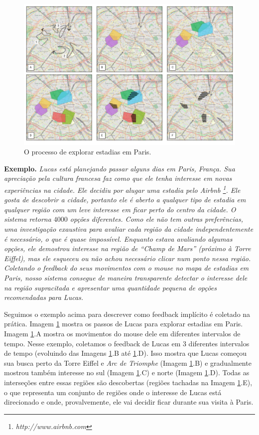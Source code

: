 \begin{figure}[t]
	\centering
	\includegraphics[width=\textwidth]{imagens/caso-de-estudo}
	\caption{O processo de explorar estadias em Paris.}
	\label{fig:regions}
\end{figure}

{\bf Exemplo.} {\em Lucas está planejando passar alguns dias em Paris, França. Sua apreciação pela cultura francesa faz como que ele tenha interesse em novas experiências na cidade. Ele decidiu por alugar uma estadia pelo Airbnb \footnote{\it http://www.airbnb.com}. Ele gosta de descobrir a cidade, portanto ele é aberto a qualquer tipo de estadia em qualquer região com um leve interesse em ficar perto do centro da cidade. O sistema retorna $4000$ opções diferentes. Como ele não tem outras preferências, uma investigação exaustiva para avaliar cada região da cidade independentemente é necessário, o que é quase impossível. Enquanto estava avaliando algumas opções, ele demostrou interesse na região de  ``Champ de Mars'' (próximo à Torre Eiffel), mas ele esqueceu ou não achou necessário clicar num ponto nessa região. Coletando o feedback do seus movimentos com o mouse no mapa de estadias em Paris, nosso sistema consegue de maneira transparente detectar o interesse dele na região supracitada e apresentar uma quantidade pequena de opções recomendadas para Lucas.}

Seguimos o exemplo acima para descrever como feedback implícito é coletado na prática. Imagem \ref{fig:regions} mostra os passos de Lucas para explorar estadias em Paris. Imagem \ref{fig:regions}.A mostra os movimentos do mouse dele em diferentes intervalos de tempo. Nesse exemplo, coletamos o feedback de Lucas em 3 diferentes intervalos de tempo (evoluindo das Imagens \ref{fig:regions}.B até \ref{fig:regions}.D). Isso mostra que Lucas começou sua busca perto da Torre Eiffel e {\em Arc de Triomphe} (Imagem \ref{fig:regions}.B) e gradualmente mostrou também interesse no sul (Imagem \ref{fig:regions}.C) e norte (Imagem \ref{fig:regions}.D). Todas as interseções entre essas regiões são descobertas (regiões tachadas na Imagem \ref{fig:regions}.E), o que representa um conjunto de regiões onde o interesse de Lucas está direcionado e onde, provalvemente, ele vai decidir ficar durante sua visita à Paris.

